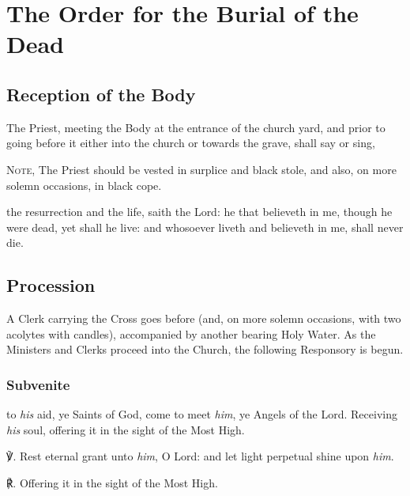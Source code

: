 \fancyhead[RE,LO]{\textit{}}
\section{The Order for the Burial of the Dead}

\subsection{Reception of the Body}
\begin{secrubric}
    The Priest, meeting the Body at the entrance of the church yard, and prior to going before it either into the church or towards the grave, shall say or sing,\par
    \textsc{Note,} The Priest should be vested in surplice and black stole, and also, on more solemn occasions, in black cope.
\end{secrubric}
 the resurrection and the life, saith the Lord: he that believeth in me, though he were dead, yet shall he live: and whosoever liveth and believeth in me, shall never die.\par

\subsection{Procession}
\begin{rubric}
	A Clerk carrying the Cross goes before (and, on more solemn occasions, with two acolytes with candles), accompanied by another bearing Holy Water. As the Ministers and Clerks proceed into the Church, the following Responsory is begun.
\end{rubric}

\subsubsection{Subvenite}
 to \textit{his} aid, ye Saints of God, come to meet \textit{him}, ye Angels of the Lord. Receiving \textit{his} soul, offering it in the sight of the Most High.\par
{}
℣. Rest eternal grant unto \textit{him}, O Lord: and let light perpetual shine upon \textit{him}.\par
℟. Offering it in the sight of the Most High.

